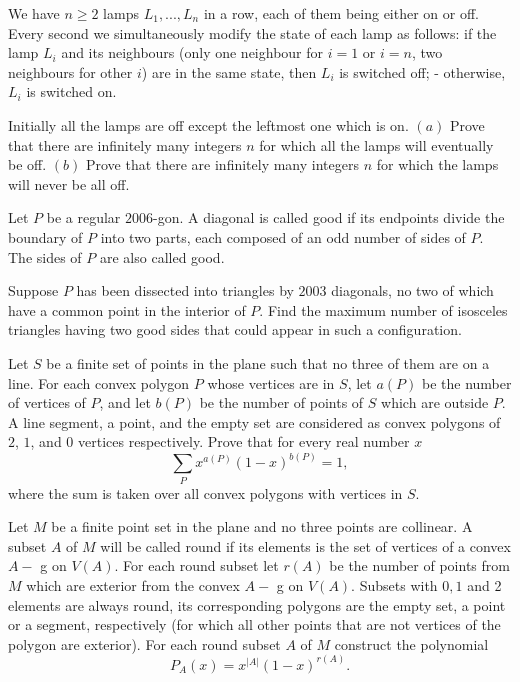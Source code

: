 \item[\textbf{C1.}]
We have 
$ n \geq 2$
 lamps 
$ L_{1}, . . . ,L_{n}$
 in a row, each of them being either on or off. Every second we simultaneously modify the state of each lamp as follows: if the lamp 
$ L_{i}$
 and its neighbours (only one neighbour for 
$ i = 1$
 or 
$ i = n$, 
 two neighbours for other 
$ i$)
 are in the same state, then 
$ L_{i}$
 is switched off; - otherwise, 
$ L_{i}$
 is switched on.


Initially all the lamps are off except the leftmost one which is on.
$ (a)$
 Prove that there are infinitely many integers 
$ n$
 for which all the lamps will eventually be off.
$ (b)$
 Prove that there are infinitely many integers 
$ n$
 for which the lamps will never be all off.

\item[\textbf{C2.}]
Let 
$P$
 be a regular 
$2006$-gon. A diagonal is called 
good
 if its endpoints divide the boundary of 
$P$
 into two parts, each composed of an odd number of sides of 
$P$.
 The sides of 
$P$
 are also called 
good.


Suppose 
$P$
 has been dissected into triangles by 
$2003$
 diagonals, no two of which have a common point in the interior of 
$P$.
 Find the maximum number of isosceles triangles having two good sides that could appear in such a configuration.

\item[\textbf{C3.}]
Let 
$ S$
 be a finite set of points in the plane such that no three of them are on a line. For each convex polygon 
$ P$
 whose vertices are in 
$ S$, 
 let 
$ a(P)$
 be the number of vertices of 
$ P$, 
 and let 
$ b(P)$
 be the number of points of 
$ S$
 which are outside 
$ P$.
 A line segment, a point, and the empty set are considered as convex polygons of 
$ 2$, 
$ 1$, 
 and 
$ 0$
 vertices respectively. Prove that for every real number 
$ x$
\[\sum_{P}{x^{a(P)}(1 - x)^{b(P)}} = 1,\]
 where the sum is taken over all convex polygons with vertices in 
$ S$.

\item[\textbf{C3'.}]

Let 
$ M$
 be a finite point set in the plane and no three points are collinear. A subset 
$ A$
 of 
$ M$
 will be called round if its elements is the set of vertices of a convex 
$ A -$
g
on 
$ V(A).$
 For each round subset let 
$ r(A)$
 be the number of points from 
$ M$
 which are exterior from the convex 
$ A -$
g
on 
$ V(A).$
 Subsets with 
$ 0,1$
 and 2 elements are always round, its corresponding polygons are the empty set, a point or a segment, respectively (for which all other points that are not vertices of the polygon are exterior). For each round subset 
$ A$
 of 
$ M$
 construct the polynomial
\[ P_A(x) = x^{|A|}(1 - x)^{r(A)}.
\]

